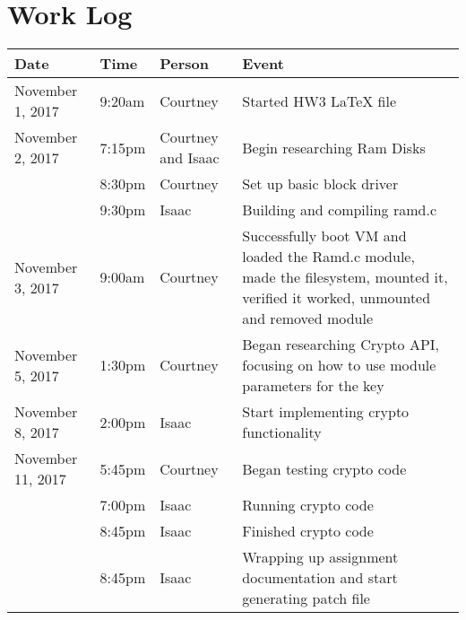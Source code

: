 \documentclass[letterpaper,10pt,draftclsnofoot,onecolumn,titlepage]{IEEEtran}
\begin{document}
\section{Work Log}
\begin{center}
\begin{tabular}{p{3cm}p{1cm}p{1cm}p{10cm} }
 Date  & Time & Person & Event \\ \hline
November 1, 2017 & 9:20am & Courtney & Started HW3 LaTeX file \\
November 2, 2017 & 7:15pm & Courtney and Isaac & Begin researching Ram Disks \\
		 & 8:30pm & Courtney & Set up basic block driver \\
		 & 9:30pm & Isaac & Building and compiling ramd.c \\
November 3, 2017 & 9:00am & Courtney & Successfully boot VM and loaded the Ramd.c module, made the filesystem, mounted it, verified it worked, unmounted and removed module \\
November 5, 2017 & 1:30pm & Courtney & Began researching Crypto API, focusing on how to use module parameters for the key \\
November 8, 2017 & 2:00pm & Isaac & Start implementing crypto functionality \\
November 11, 2017 & 5:45pm & Courtney & Began testing crypto code \\
		  & 7:00pm & Isaac & Running crypto code \\
   		  & 8:45pm & Isaac & Finished crypto code \\
   		  & 8:45pm & Isaac & Wrapping up assignment documentation and start generating patch file \\
\end{tabular}
\end{center}
\end{document}
